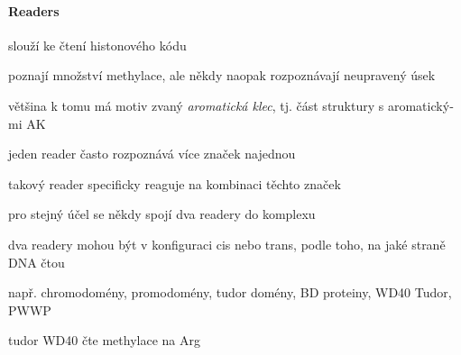 \documentclass[DIV=8]{scrreprt}
\begin{document}
\paragraph{Readers}
\begin{myItemize}[nosep]
    \item slouží ke čtení histonového kódu
\begin{myItemize}[nosep]
    \item poznají množství methylace, ale někdy naopak rozpoznávají neupravený úsek
    \item větši­na k tomu má motiv zvaný \emph{aro­mat­ick­á klec}, tj. část struktury s aro­mat­ick­ý­mi AK
\end{myItemize}

    \item jeden reader často rozpoznává více značek najednou
\begin{myItemize}[nosep]
    \item takový reader specificky reaguje na kombinaci těchto značek
    \item pro stejný účel se někdy spojí dva readery do komplexu
\begin{myItemize}[nosep]
    \item dva readery mohou být v konfiguraci cis nebo trans, podle toho, na jaké straně DNA čtou
\end{myItemize}

\end{myItemize}

    \item např. chromodomény, promodomény, tudor domény, BD pro­teiny, WD40 Tu­dor, PWWP
\begin{myItemize}[nosep]
    \item tudor WD40 čte methylace na Arg
\end{myItemize}

\end{myItemize}
\end{document}
